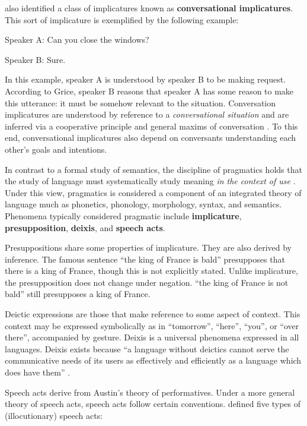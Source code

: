  \cite{Grice:1975vw}  also identified a class of implicatures known as \textbf{conversational implicatures}. This sort of implicature is exemplified by the following example:

\begin{description}
\item Speaker A: Can you close the windows?
\item Speaker B: Sure.
\end{description}

In this example, speaker A is understood by speaker B to be making request. According to Grice, speaker B reasons that speaker A has some reason to make this utterance: it must be somehow relevant to the situation. Conversation implicatures are understood by reference to a \emph{conversational situation} and are inferred via a cooperative principle and general maxims of conversation  \cite[p. 46; covered in more depth later in this chapter]{Grice:1975vw}.  To this end, conversational implicatures also depend on conversants understanding each other's goals and intentions.

In contrast to a formal study of semantics, the discipline of pragmatics holds that the study of language must systematically study meaning \emph{in the context of use}  \citep{Huang:2007ww}.  Under this view, pragmatics is considered a component of an integrated theory of language much as phonetics, phonology, morphology, syntax, and semantics. Phenomena typically considered pragmatic include \textbf{implicature}, \textbf{presupposition}, \textbf{deixis}, and \textbf{speech acts}. 

Presuppositions share some properties of implicature. They are also derived by inference. The famous sentence ``the king of France is bald'' presupposes that there is a king of France, though this is not explicitly stated. Unlike implicature, the presupposition does not change under negation. ``the king of France is not bald'' still presupposes a king of France. 

Deictic expressions are those that make reference to some aspect of context. This context may be expressed symbolically as in ``tomorrow'', ``here'', ``you'', or ``over there'', accompanied by gesture. Deixis is a universal phenomena expressed in all languages. Deixis exists because ``a language without deictics cannot serve the communicative needs of its users as effectively and efficiently as a language which does have them''  \cite[p. 132]{Huang:2007ww}. 

Speech acts derive from Austin's theory of performatives. Under a more general theory of speech acts, speech acts follow certain conventions.  \cite{Searle:1969vw}  defined five types of (illocutionary) speech acts:

